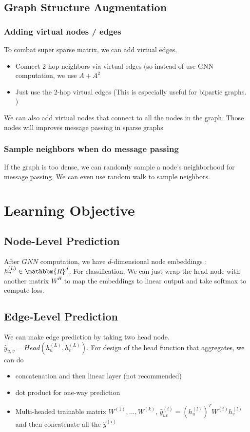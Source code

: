 \subsection{Graph Structure Augmentation}
\subsubsection{Adding virtual nodes / edges}
To combat super sparse matrix, we can add virtual edges,
    \begin{itemize}
        \item Connect 2-hop neighbors via virtual edges (so instead of use GNN computation, we use $A + A^2$
        \item Just use the 2-hop virtual edges (This is especially useful for bipartie graphs. )
    \end{itemize}
We can also add virtual nodes that connect to all the nodes in the graph. Those nodes will improves message passing in sparse graphs 


\subsubsection{Sample neighbors when do message passing} 
If the graph is too dense, we can randomly sample a node's neighborhood for message passing. We can even use random walk to sample neighbors. 




\section{Learning Objective}
\subsection{Node-Level Prediction} 
After $GNN$ computation, we have $d$-dimensional node embeddings : $h_v^{(L)} \in \mathbbm{R}^d$. For classification, We can just wrap the head node with another matrix $W^H$ to map the embeddings to linear output and take softmax to compute loss. 


\subsection{Edge-Level Prediction}
We can make edge prediction by taking two head node. $\hat{y}_{u,v}= Head(h_u^{(L)}, h_v^{(L)})$. For design of the head function that aggregates, we can do 
    \begin{itemize}
        \item concatenation and then linear layer (not recommended)
        \item dot product for one-way prediction
        \item Multi-headed trainable matrix $W^{(1)}, ..., W^{(k)}$, $\hat{y}_{uv}^{(i)} = (h_u^{(l)})^TW^{(i)}h_v^{(l)}$ and then concatenate all the $\hat{y}^{(i)}$
    \end{itemize}


